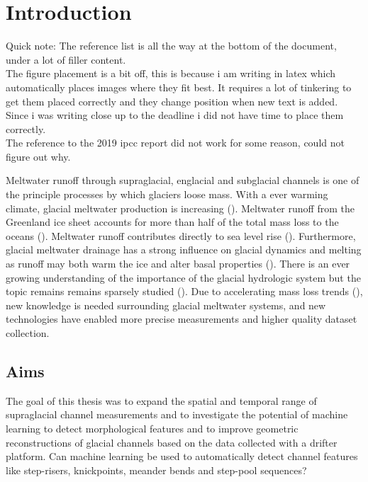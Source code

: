 \chapter{Introduction}
\label{sec:intro}
Quick note: The reference list is all the way at the bottom of the document, under a lot of filler content.\\
The figure placement is a bit off, this is because i am writing in latex which automatically places images where they fit best. It requires a lot of tinkering to get them placed correctly and they change position when new text is added. Since i was writing close up to the deadline i did not have time to place them correctly.\\
The reference to the 2019 ipcc report did not work for some reason, could not figure out why. 
\newline
\newline

Meltwater runoff through supraglacial, englacial and subglacial channels is one of the principle processes by which glaciers loose mass. With a ever warming climate, glacial meltwater production is increasing (\cite{IPCC_2019}). Meltwater runoff from the Greenland ice sheet accounts for more than half of the total mass loss to the oceans (\cite{pitcher_smith_2015}). Meltwater runoff contributes directly to sea level rise (\cite{pitcher_smith_2019}). Furthermore, glacial meltwater drainage has a strong influence on glacial dynamics and melting as runoff may both warm the ice and alter basal properties (\cite{pitcher_smith_2019}). There is an ever growing understanding of the importance of the glacial hydrologic system but the topic remains remains sparsely studied (\cite{pitcher_smith_2019}). Due to accelerating mass loss trends (\cite{mass_loss_trend}), new knowledge is needed surrounding glacial meltwater systems, and new technologies have enabled more precise measurements and higher quality dataset collection.
\section{Aims}
The goal of this thesis was to expand the spatial and temporal range of supraglacial channel measurements and to investigate the potential of machine learning to detect morphological features and to improve geometric reconstructions of glacial channels based on the data collected with a drifter platform. Can machine learning be used to automatically detect channel features like step-risers, knickpoints, meander bends and step-pool sequences? 
